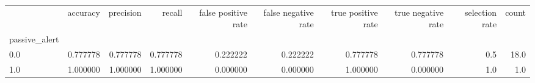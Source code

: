 \begin{tabular}{lrrrrrrrrr}
\toprule
{} &  accuracy &  precision &    recall &  false positive rate &  false negative rate &  true positive rate &  true negative rate &  selection rate &  count \\
passive\_alert &           &            &           &                      &                      &                     &                     &                 &        \\
\midrule
0.0           &  0.777778 &   0.777778 &  0.777778 &             0.222222 &             0.222222 &            0.777778 &            0.777778 &             0.5 &   18.0 \\
1.0           &  1.000000 &   1.000000 &  1.000000 &             0.000000 &             0.000000 &            1.000000 &            0.000000 &             1.0 &    1.0 \\
\bottomrule
\end{tabular}

